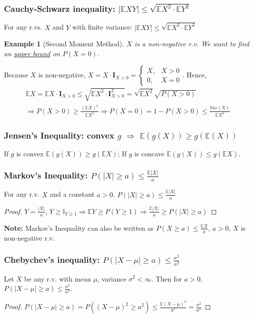 \documentclass[11pt,a4paper]{article}
\newtheorem{example}{Example}
\begin{document}
\subsubsection{Cauchy-Schwarz inequality: $|\mathbb{E}XY|\leq \sqrt{\mathbb{E}X^2\cdot \mathbb{E}Y^2}$}
For any r.vs. $X$ and $Y$ with finite variance: $|\mathbb{E}XY|\leq \sqrt{\mathbb{E}X^2\cdot \mathbb{E}Y^2}$
\begin{example}[Second Moment Method]
$X$ is a non-negative r.v. We want to find an \underline{upper bound} on $P(X=0)$.
\end{example}
Because $X$ is non-negative, $X=X\cdot \textbf{I}_{X>0}=\left\{\begin{matrix}
    X,&X>0\\
    0,&X=0
\end{matrix}\right.$. Hence,
\begin{equation}
    \begin{aligned}
        \mathbb{E}X= \mathbb{E}X\cdot \textbf{I}_{X>0}\leq \sqrt{\mathbb{E} X^2\cdot \textbf{I}^2_{X>0}}=\sqrt{\mathbb{E}X^2}\sqrt{P(X>0)}\\
        \Rightarrow P(X>0)\geq\frac{(\mathbb{E}X)^2}{\mathbb{E}X^2} \Rightarrow P(X=0)=1-P(X>0)\leq \frac{Var(X)}{\mathbb{E}X^2}
    \end{aligned}
    \nonumber
\end{equation}

\subsubsection{Jensen's Inequality: convex $g$ $\Rightarrow$ $\mathbb{E}(g(X))\geq g(\mathbb{E}(X))$}
If $g$ is convex $\mathbb{E}(g(X))\geq g(\mathbb{E}X)$; If $g$ is concave $\mathbb{E}(g(X))\leq g(\mathbb{E}X)$.

\subsubsection{Markov's Inequality: $P(|X|\geq a)\leq \frac{\mathbb{E}|X|}{a}$}
For any r.v. $X$ and a constant $a>0$. $P(|X|\geq a)\leq \frac{\mathbb{E}|X|}{a}$
\begin{proof}
$Y=\frac{|X|}{a}$, $Y\geq \mathbb{I}_{Y\geq 1} \Rightarrow \mathbb{E}Y\geq P(Y\geq 1) \Rightarrow \frac{\mathbb{E}|X|}{a}\geq P(|X|\geq a)$
\end{proof}
\textbf{Note:} Markov's Inequality can also be written as $P(X\geq a)\leq \frac{\mathbb{E}X}{a}$, $a>0$, $X$ is non-negative r.v.

\subsubsection{Chebychev's inequality: $P(|X-\mu|\geq a)\leq \frac{\sigma^2}{a^2}$}
Let $X$ be any r.v. with mean $\mu$, variance $\sigma^2<\infty$. Then for $a>0$, $P(|X-\mu|\geq a)\leq \frac{\sigma^2}{a^2}$.
\begin{proof}
$P(|X-\mu|\geq a)=P((X
-\mu)^2\geq a^2)\leq \frac{\mathbb{E}(X-\mu)^2}{a^2}=\frac{\sigma^2}{a^2}$
\end{proof}
\end{document}
